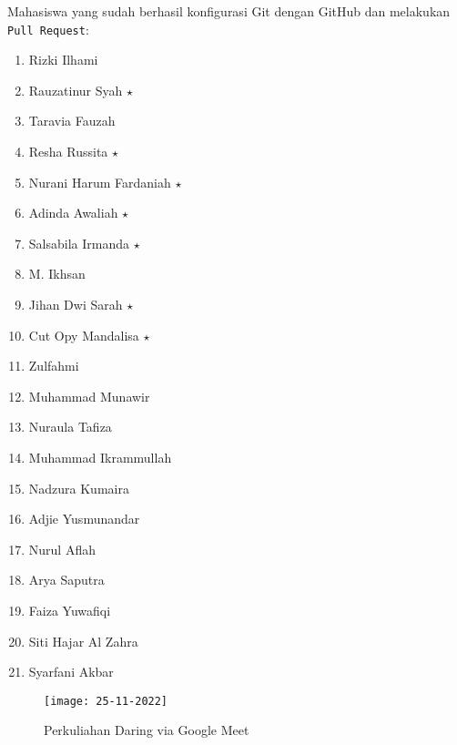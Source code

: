 \documentclass[a4paper]{tufte-handout}
\begin{document}
Mahasiswa yang sudah berhasil konfigurasi Git dengan GitHub dan melakukan {\tt Pull Request}:
\begin{multicols}{2}
\begin{enumerate}
\item Rizki Ilhami
\item Rauzatinur Syah $\star$
\item Taravia Fauzah
\item Resha Russita $\star$
\item Nurani Harum Fardaniah $\star$
\item Adinda Awaliah $\star$
\item Salsabila Irmanda $\star$
\item M. Ikhsan
\item Jihan Dwi Sarah $\star$
\item Cut Opy Mandalisa $\star$
\item Zulfahmi
\item Muhammad Munawir
\item Nuraula Tafiza
\item Muhammad Ikrammullah
\item Nadzura Kumaira
\item Adjie Yusmunandar
\item Nurul Aflah
\item Arya Saputra
\item Faiza Yuwafiqi
\item Siti Hajar Al Zahra
\item Syarfani Akbar
\end{enumerate}
\end{multicols}

\begin{figure}[!ht]
\texttt{[image: 25-11-2022]}
\caption{Perkuliahan Daring via Google Meet}
\label{gam:perkuliahan-25-11}
\end{figure}

\vspace*{-.5cm}
\hrulefill
\end{document}
